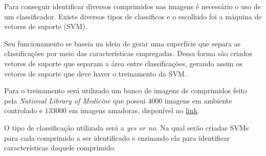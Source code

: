 Para conseguir identificar diversos comprimidos nas imagens é necessário o uso de um classificador. Existe diversos tipos de classificos e o escolhido foi a máquina de vetores de suporte (SVM). 

Seu funcionamento se baseia na ideia de gerar uma superfície que separa as classificações por meio das características empregadas. Dessa forma são criados vetores de suporte que separam a área entre classificações, gerando assim os vetores de suporte que deve haver o treinamento da SVM.

Para o treinamento será utilizado um banco de imagens de comprimidos feito pela \textit{National Library of Medicine} que possui 4000 imagens em ambiente controlado e 133000 em imagens amadoras, disponível no  \href{https://www.nlm.nih.gov/databases/download/data_distrib_main.html}{link}. 

O tipo de classificação utilizada será a \textit{yes or no}. Na qual serão criadas SVMs para cada comprimido a ser identificado e ensinando ela para identificar características daquele comprimido.

